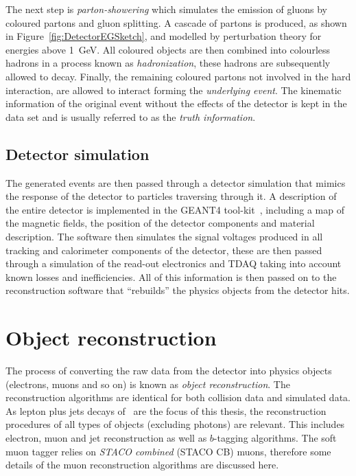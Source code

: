 The next step is \emph{parton-showering} which simulates the emission of gluons by coloured partons and gluon splitting. A cascade of partons is produced, as shown in Figure~\ref{fig:DetectorEGSketch}, and modelled by perturbation theory for energies above \SI{1}{GeV}. All coloured objects are then combined into colourless hadrons in a process known as \emph{hadronization}, these hadrons are subsequently allowed to decay. Finally, the remaining coloured partons not involved in the hard interaction, are allowed to interact forming the \emph{underlying event}. The kinematic information of the original event without the effects of the detector is kept in the data set and is usually referred to as the \emph{truth information}.

\subsection{Detector simulation}\label{sec:DetectorSimulation}

The generated events are then passed through a detector simulation that mimics the response of the detector to particles traversing through it. A description of the entire detector is implemented in the GEANT4 tool-kit~\cite{Detector:Geant4}, including a map of the magnetic fields, the position of the detector components and material description. The software then simulates the signal voltages produced in all tracking and calorimeter components of the detector, these are then passed through a simulation of the read-out electronics and TDAQ taking into account known losses and inefficiencies. All of this information is then passed on to the reconstruction software that ``rebuilds'' the physics objects from the detector hits.

\section{Object reconstruction}\label{sec:DetectorEventReco}

The process of converting the raw data from the detector into physics objects (electrons, muons and so on) is known as \emph{object reconstruction}. The reconstruction algorithms are identical for both collision data and simulated data. As lepton plus jets decays of \ttbar\ are the focus of this thesis, the reconstruction procedures of all types of objects (excluding photons) are relevant. This includes electron, muon and jet reconstruction as well as $b$-tagging algorithms. The soft muon tagger relies on \emph{STACO combined} (STACO CB) muons, therefore some details of the muon reconstruction algorithms are discussed here.

